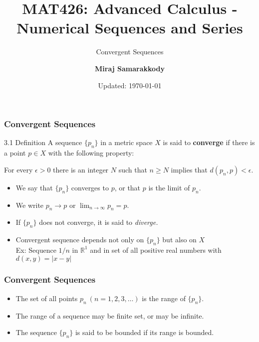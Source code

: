 \documentclass{beamer}
\title{MAT426: Advanced Calculus - Numerical Sequences and Series}
\subtitle{Convergent Sequences \cite{R1976}}
\author{\textbf{Miraj Samarakkody}}
\institute{Tougaloo College}
\date{Updated: \today}
\begin{document}
\begin{frame}
    \titlepage
\end{frame}





    \begin{frame}
        \frametitle{Convergent Sequences}
    
        \begin{block}{3.1 Definition}
            A sequence \(\{p_n\}\) in a metric space \(X\) is said to \textbf{converge} if there is a point \(p \in X\) with the following property: \\
            \vspace{0.2in}

            For every \(\epsilon>0\) there is an integer \(N\) such that \(n\geq N\) implies that \(d(p_n,p) < \epsilon\). 
        \end{block} \pause 
        \begin{itemize}
            \item We say that \(\{p_n\}\) converges to \(p\), or that \(p\) is the limit of \(p_n\). \pause
            \item We write \(p_n \to p \) or \(\lim_{n \to \infty}p_n =p\). \pause
            \item If \(\{p_n\}\) does not converge, it is said to \textit{diverge.}\pause
            \item Convergent sequence depends not only on \(\{p_n\}\) but also on \(X\)\\
            Ex: Sequence \(1/n\) in \(\mathbb{R}^1\) and in set of all positive real numbers with \(d(x,y)=|x-y|\)
        \end{itemize}
    \end{frame}

\begin{frame}
    \frametitle{Convergent Sequences}

    \begin{itemize}
        \item The set of all points \(p_n~(n=1,2,3, \dots)\) is the range of \(\{p_n\}. \)
        \item The range of a sequence may be finite set, or may be infinite. 
        \item The sequence \(\{p_n\}\) is said to be bounded if its range is bounded. 
    \end{itemize}

\end{frame}
\end{document}
